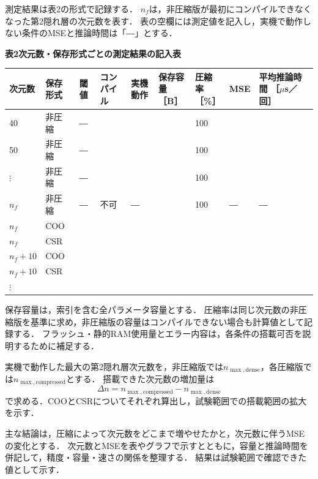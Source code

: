 \documentclass[a4paper,11pt]{article}
\begin{document}
測定結果は表2の形式で記録する．
$n_f$は，非圧縮版が最初にコンパイルできなくなった第2隠れ層の次元数を表す．
表の空欄には測定値を記入し，実機で動作しない条件のMSEと推論時間は「―」とする．

\begin{center}
\footnotesize
\textbf{表2\quad 次元数・保存形式ごとの測定結果の記入表}\par\medskip
\setlength{\tabcolsep}{3pt}
\renewcommand{\arraystretch}{1.6}
\begin{tabular}{p{11mm}p{13mm}p{9mm}p{18mm}p{13mm}p{20mm}p{15mm}p{14mm}p{25mm}}
\toprule
次元数 & 保存形式 & 閾値 & コンパイル & 実機動作 & \shortstack[l]{保存容量\\［B］} & \shortstack[l]{圧縮率\\［\%］} & MSE & \shortstack[l]{平均推論時間\\［$\mu$s／回］}\\
\midrule
40 & 非圧縮 & ― & & & & 100 & & \\
\midrule
50 & 非圧縮 & ― & & & & 100 & & \\
\midrule
$\vdots$ & 非圧縮 & ― & & & & 100 & & \\
\midrule
$n_f$ & 非圧縮 & ― & 不可 & ― & & 100 & ― & ―\\
\midrule
$n_f$ & COO & & & & & & & \\
\midrule
$n_f$ & CSR & & & & & & & \\
\midrule
$n_f+10$ & COO & & & & & & & \\
\midrule
$n_f+10$ & CSR & & & & & & & \\
\midrule
$\vdots$ & & & & & & & & \\
\bottomrule
\end{tabular}
\end{center}

保存容量は，索引を含む全パラメータ容量とする．
圧縮率は同じ次元数の非圧縮版を基準に求め，非圧縮版の容量はコンパイルできない場合も計算値として記録する．
フラッシュ・静的RAM使用量とエラー内容は，各条件の搭載可否を説明するために補足する．

実機で動作した最大の第2隠れ層次元数を，非圧縮版では$n_{\max,\mathrm{dense}}$，各圧縮版では$n_{\max,\mathrm{compressed}}$とする．
搭載できた次元数の増加量は
\[
 \Delta n=n_{\max,\mathrm{compressed}}-n_{\max,\mathrm{dense}}
\]
で求める．COOとCSRについてそれぞれ算出し，試験範囲での搭載範囲の拡大を示す．

主な結論は，圧縮によって次元数をどこまで増やせたかと，次元数に伴うMSEの変化とする．
次元数とMSEを表やグラフで示すとともに，容量と推論時間を併記して，精度・容量・速さの関係を整理する．
結果は試験範囲で確認できた値として示す．
\end{document}
